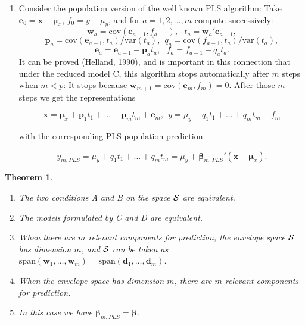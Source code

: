 \documentclass[a4paper, 11pt]{article}
\newtheorem{theorem}{Theorem} \newtheorem{principle}{Principle}
\begin{document}
\begin{enumerate}[label=\Alph*.]
\item Consider the  population version of the well known PLS algorithm: Take
  $\bm{e}_{0}=\bm{x}-\bm{\mu}_{x}$, $f_{0}=y-\mu_{y}$, and for $a=1,2,...,m$ compute successively:
  \begin{equation} \label{wt}\bm{w}_{a}=\mathrm{cov}(\bm{e}_{a-1}, f_{a-1}),\ \ \
    t_{a}=\bm{w}_{a}'\bm{e}_{a-1},\end{equation}
  \begin{equation}\label{pq}\bm{p}_{a}=\mathrm{cov}(\bm{e}_{a-1}, t_{a})/\mathrm{var}(t_{a}),\ \
    q_{a}=\mathrm{cov}(f_{a-1},t_{a})/\mathrm{var}(t_{a}),\end{equation}
  \[\bm{e}_{a}=\bm{e}_{a-1}-\bm{p}_{a}t_{a},\ \ \
    f_{a}=f_{a-1}-q_{a}t_{a}.\]
  It can be proved (Helland, 1990), and is important in this connection that under the reduced model C, this algorithm stops automatically after $m$ steps when
  $m<p$: It stops because $\bm{w}_{m+1}=\mathrm{cov}(\bm{e}_{m},f_{m})=0$. After those $m$ steps we get the representations

  \begin{equation}
    \label{latent}
    \bm{x}=\bm{\mu}_{x}+\bm{p}_{1}t_{1}+...+\bm{p}_{m}t_{m}+\bm{e}_{m},\ \ y=\mu_{y}+q_{1}t_{1}+...+q_{m}t_{m}+ f_{m}
  \end{equation}

  with the corresponding PLS population prediction

  \[y_{m,PLS}=\mu_{y}+q_{1}t_{1}+...+q_{m}t_{m}=\mu_{y}+\bm{\beta}_{m,PLS}'(\bm{x}-\bm{\mu}_{x}).\]

\end{enumerate}

\smallskip

\begin{theorem} {\rm\citep{cook2013envelopes,helland1990partial}}
  \begin{enumerate}[label=(\alph*)]
  \item The two conditions A and B on the space $\cal{S}$ are equivalent.
  \item The models formulated by C and D are equivalent.
  \item When there are $m$ relevant components for prediction, the envelope space $\cal{S}$ has dimension $m$, and $\cal{S}$ can be taken as $\mathrm{span}\left(\bm{w}_{1}, \ldots, \bm{w}_{m}\right) = \mathrm{span}\left(\bm{d}_{1}, \ldots, \bm{d}_{m}\right)$.
  \item When the envelope space has dimension $m$, there are $m$ relevant components for prediction.
  \item In this case we have $\bm{\beta}_{m,PLS}=\bm{\beta}$.
  \end{enumerate}
\end{theorem}
\end{document}
